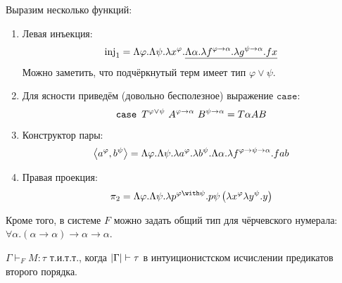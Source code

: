 Выразим несколько функций:
\begin{enumerate}
    \item Левая инъекция:
    \[
        \operatorname{inj}_1 = \Lambda \varphi . \Lambda \psi . \lambda x^\varphi .
            \underline{\Lambda \alpha . \lambda f^{\varphi\to\alpha}.\lambda g^{\psi\to\alpha}.f x}
    \]
    Можно заметить, что подчёркнутый терм имеет тип $\varphi \vee \psi$.
    \item Для ясности приведём (довольно бесполезное) выражение $\mathtt{case}$:
    \[
        \mathinner{\mathtt{case}}~T^{\varphi\vee\psi}~A^{\varphi\to\alpha}~B^{\psi\to\alpha} = T \alpha A B
    \]
    \item Конструктор пары:
    \[
        \left<a^\varphi, b^\psi\right> = \Lambda \varphi . \Lambda \psi . \lambda a^\varphi . \lambda b^\psi .
            \Lambda \alpha . \lambda f^{\varphi\to\psi\to\alpha} . f a b
    \]
    \item Правая проекция:
    \[
        \pi_2 = \Lambda \varphi . \Lambda \psi . \lambda p^{\varphi \with \psi}.p\psi\left(\lambda x^\varphi\lambda y^\psi.y\right)
    \]
\end{enumerate}

Кроме того, в системе $F$ можно задать общий тип для чёрчевского нумерала: $\forall \alpha.(\alpha\to\alpha)\to\alpha\to\alpha$.
\todo

\begin{theorem}
    $\Gamma \vdash_F M :\tau$ т.и.т.т., когда $\left|\Gamma\right| \vdash \tau$ в интуиционистском исчислении предикатов второго порядка.
\end{theorem}

